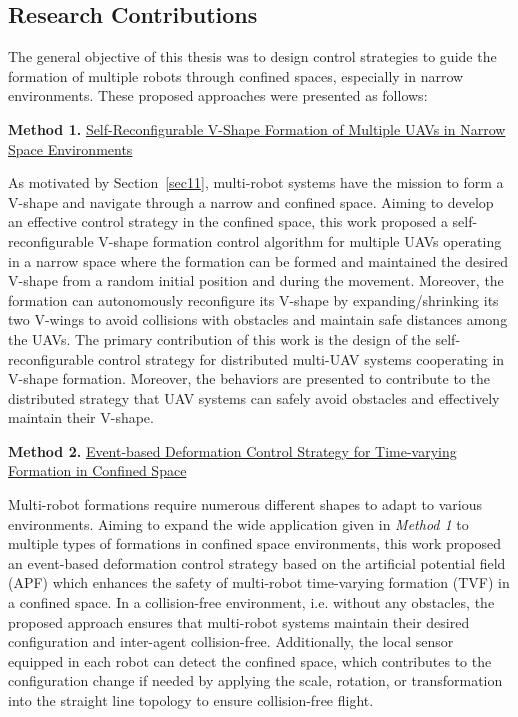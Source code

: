 \subsection{Research Contributions}
The general objective of this thesis was to design control strategies to guide the formation of multiple robots through confined spaces, especially in narrow environments. These proposed approaches were presented as follows:

\noindent \textbf{Method 1.} \hyperref[paper1]{Self-Reconfigurable V-Shape Formation of Multiple UAVs in Narrow Space Environments}

As motivated by Section~\ref{sec11}, multi-robot systems have the mission to form a V-shape and navigate through a narrow and confined space. Aiming to develop an effective control strategy in the confined space, this work proposed a self-reconfigurable V-shape formation control algorithm for multiple UAVs operating in a narrow space where the formation can be formed and maintained the desired V-shape from a random initial position and during the movement. Moreover, the formation can autonomously reconfigure its V-shape by expanding/shrinking its two V-wings to avoid collisions with obstacles and maintain safe distances among the UAVs. The primary contribution of this work is the design of the self-reconfigurable control strategy for distributed multi-UAV systems cooperating in V-shape formation. Moreover, the behaviors are presented to contribute to the distributed strategy that UAV systems can safely avoid obstacles and effectively maintain their V-shape.

\noindent \textbf{Method 2.} \hyperref[paper2]{Event-based Deformation Control Strategy for Time-varying Formation in Confined Space}

Multi-robot formations require numerous different shapes to adapt to various environments. Aiming to expand the wide application given in \textit{Method 1} to multiple types of formations in confined space environments, this work proposed an event-based deformation control strategy based on the artificial potential field (APF) which enhances the safety of multi-robot time-varying formation (TVF) in a confined space. In a collision-free environment, i.e. without any obstacles, the proposed approach ensures that multi-robot systems maintain their desired configuration and inter-agent collision-free. Additionally, the local sensor equipped in each robot can detect the confined space, which contributes to the configuration change if needed by applying the scale, rotation, or transformation into the straight line topology to ensure collision-free flight.

